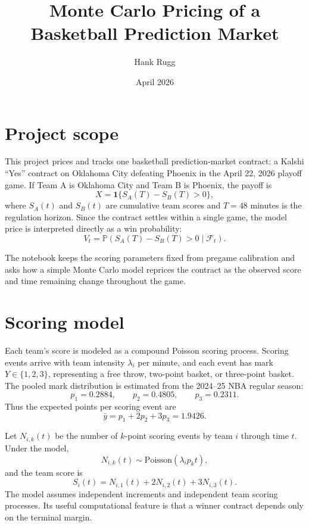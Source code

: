 \documentclass[10pt]{article}
\title{Monte Carlo Pricing of a Basketball Prediction Market}
\author{Hank Rugg}
\date{April 2026}
\begin{document}
\maketitle

\section{Project scope}

This project prices and tracks one basketball prediction-market contract: a
Kalshi ``Yes'' contract on Oklahoma City defeating Phoenix in the April 22,
2026 playoff game. If Team A is Oklahoma City and Team B is Phoenix, the payoff is
\begin{equation}
    X = \mathbf{1}\{S_A(T) - S_B(T) > 0\},
\end{equation}
where \(S_A(t)\) and \(S_B(t)\) are cumulative team scores and \(T=48\)
minutes is the regulation horizon. Since the contract settles within a single
game, the model price is interpreted directly as a win probability:
\begin{equation}
    V_t = \mathbb{P}\left(S_A(T) - S_B(T) > 0 \mid \mathcal{F}_t\right).
\end{equation}

The notebook keeps the scoring parameters fixed from pregame calibration and
asks how a simple Monte Carlo model reprices the contract as the observed score
and time remaining change throughout the game.

\section{Scoring model}

Each team's score is modeled as a compound Poisson scoring process. Scoring
events arrive with team intensity \(\lambda_i\) per minute, and each event has
mark \(Y \in \{1,2,3\}\), representing a free throw, two-point basket, or
three-point basket. The pooled mark distribution is estimated from the 2024--25
NBA regular season:
\[
    p_1 = 0.2884, \qquad p_2 = 0.4805, \qquad p_3 = 0.2311.
\]
Thus the expected points per scoring event are
\[
    \bar y = p_1 + 2p_2 + 3p_3 = 1.9426.
\]

Let \(N_{i,k}(t)\) be the number of \(k\)-point scoring events by team \(i\)
through time \(t\). Under the model,
\[
    N_{i,k}(t) \sim \mathrm{Poisson}(\lambda_i p_k t),
\]
and the team score is
\begin{equation}
    S_i(t) = N_{i,1}(t) + 2N_{i,2}(t) + 3N_{i,3}(t).
\end{equation}
The model assumes independent increments and independent team scoring processes.
Its useful computational feature is that a winner contract depends only on the
terminal margin.
\end{document}
